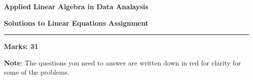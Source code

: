 \documentclass[12pt]{article}
\begin{document}
\begin{center}
\begin{large}
\textbf{Applied Linear Algebra in Data Analaysis}\\
\vspace{0.1cm}
\end{large}
\textbf{Solutions to Linear Equations Assignment}
\end{center}
\hrule
\vspace{1em}

\begin{large}
    \textbf{Marks: 31}
\end{large}
\vspace{0.2cm}

\textbf{Note}: The questions you need to answer are written down in red for clarity for some of the problems.
\end{document}
